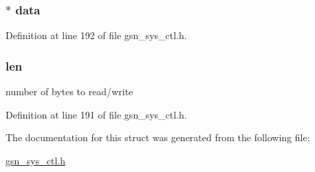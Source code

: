 \hypertarget{a00251_ab0caf92e8b07e8b3a5f718e696b1f6a8}{
\subsubsection[{data}]{$\ast$ {\bf data}}}
\label{a00251_ab0caf92e8b07e8b3a5f718e696b1f6a8}


Definition at line 192 of file gsn\_\-sys\_\-ctl.h.

\hypertarget{a00251_ab9abc6ede61238a05664f9c37e4412c3}{
\subsubsection[{len}]{ {\bf len}}}
\label{a00251_ab9abc6ede61238a05664f9c37e4412c3}
number of bytes to read/write 

Definition at line 191 of file gsn\_\-sys\_\-ctl.h.



The documentation for this struct was generated from the following file:\begin{DoxyCompactItemize}
\item 
\hyperlink{a00592}{gsn\_\-sys\_\-ctl.h}\end{DoxyCompactItemize}
